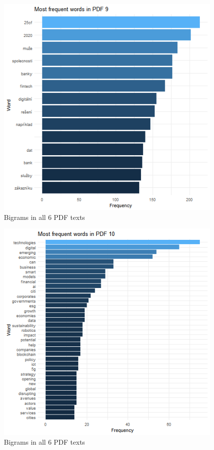 \documentclass[
]{book}
\begin{document}
\begin{figure}

{\centering \includegraphics[width=0.8\linewidth]{img/freqP9} 

}

\caption{Bigrams in all 6 PDF texts}\label{fig:nice-figF7-16-3}
\end{figure}
\begin{figure}

{\centering \includegraphics[width=0.8\linewidth]{img/freqP10} 

}

\caption{Bigrams in all 6 PDF texts}\label{fig:nice-figF7-16-4}
\end{figure}
\end{document}

